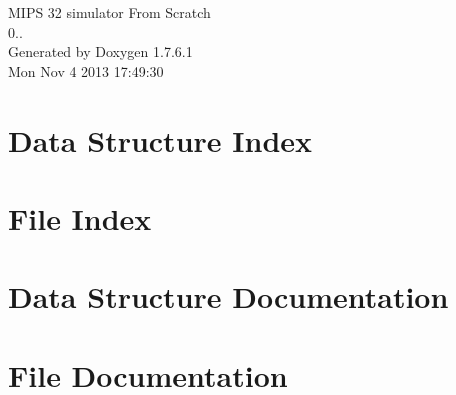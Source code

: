\documentclass[a4paper]{book}
\begin{document}
\hypersetup{pageanchor=false,citecolor=blue}
\begin{titlepage}
\vspace*{7cm}
\begin{center}
{\Large \-M\-I\-P\-S 32 simulator \-From \-Scratch \\[1ex]\large 0.. }\\
\vspace*{1cm}
{\large \-Generated by Doxygen 1.7.6.1}\\
\vspace*{0.5cm}
{\small Mon Nov 4 2013 17:49:30}\\
\end{center}
\end{titlepage}
\clearemptydoublepage
{}
\tableofcontents
\clearemptydoublepage
{}
\hypersetup{pageanchor=true,citecolor=blue}
\chapter{\-Data \-Structure \-Index}

\chapter{\-File \-Index}

\chapter{\-Data \-Structure \-Documentation}








\chapter{\-File \-Documentation}





















\printindex
\end{document}
